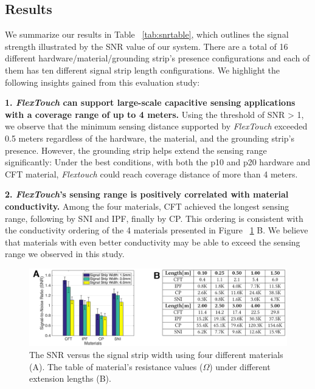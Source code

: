 \subsection{Results}

We summarize our results in Table ~\ref{tab:snrtable}, which outlines the signal strength illustrated by the SNR value of our system. There are a total of 16 different hardware/material/grounding strip's presence configurations and each of them has ten different signal strip length configurations. We highlight the following insights gained from this evaluation study:

\textbf{1. \textit{FlexTouch} can support large-scale capacitive sensing applications with a coverage range of up to 4 meters.}  Using the  threshold of SNR > 1, we observe that the minimum sensing distance supported by \textit{FlexTouch} exceeded 0.5 meters regardless of the hardware, the material, and the grounding strip's presence. However, the grounding strip helps extend the sensing range significantly: Under the best conditions, with both the p10 and p20 hardware and CFT material, \textit{Flextouch} could reach coverage distance of more than 4 meters.

\textbf{2. \textit{FlexTouch}'s sensing range is positively correlated with material conductivity.} Among the four materials, CFT achieved the longest sensing range, following by SNI and IPF, finally by CP. This ordering is consistent with the conductivity ordering of the 4 materials presented in Figure ~\ref{fig:material-width} B. We believe that materials with even better conductivity may be able to exceed the sensing range we observed in this study. 

\begin{figure}[ht]  
\centering
  \includegraphics[width=0.75\columnwidth]{figures/material-width-and-table.png}

  \setlength{\belowcaptionskip}{-8pt}
  \caption{The SNR versus the signal strip width using four different materials (A). The table of material's resistance values ($\Omega$) under different extension lengths (B).}
  \label{fig:material-width}
\end{figure}

